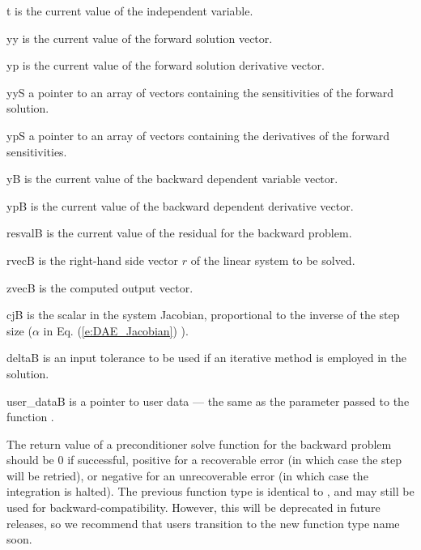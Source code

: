 {
  \begin{args}
  \item[t]
    is the current value of the independent variable.
  \item[yy]
    is the current value of the forward solution vector.
  \item[yp]
    is the current value of the forward solution derivative vector.
  \item[yyS]
    a pointer to an array of  vectors containing the sensitivities of
    the forward solution.
  \item[ypS]
    a pointer to an array of  vectors containing the derivatives of
    the forward sensitivities.
  \item[yB]
    is the current value of the backward dependent variable vector.
  \item[ypB]
    is the current value of the backward dependent derivative vector.
  \item[resvalB]
    is the current value of the residual for the backward problem.
  \item[rvecB]
    is the right-hand side vector $r$ of the linear system to be solved.
  \item[zvecB]
    is the computed output vector.
  \item[cjB]
    is the scalar in the system Jacobian, proportional to the inverse of the
    step size ($\alpha$ in Eq. (\ref{e:DAE_Jacobian}) ).
  \item[deltaB]
    is an input tolerance to be used if an iterative method
    is employed in the solution.
  \item[user\_dataB]
    is a pointer to user data --- the same as the 
    parameter passed to the function .
  \end{args}
}
{
  The return value of a preconditioner solve function for the backward
  problem should be $0$ if successful,
  positive for a recoverable error (in which case the step will be retried), or
  negative for an unrecoverable error (in which case the integration is halted).
}
{
  The previous function type  is identical to
  , and may still be used for backward-compatibility.
  However, this will be deprecated in future releases, so we recommend
  that users transition to the new function type name soon.
}

